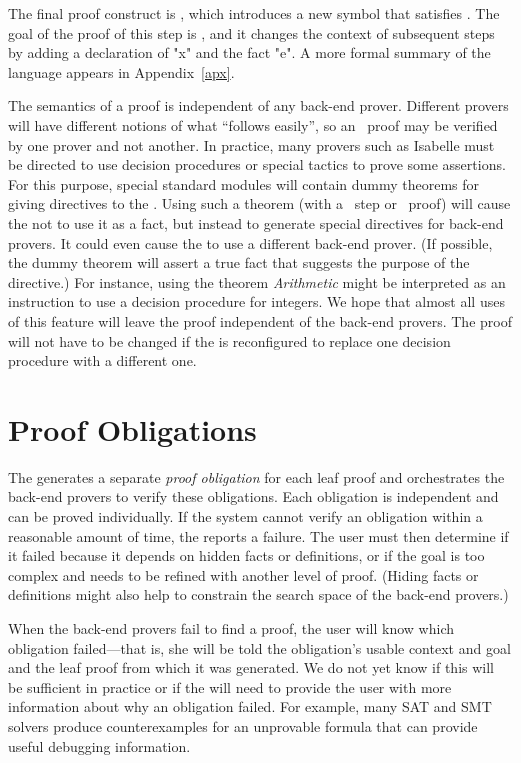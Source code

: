 \documentclass[a4paper]{easychair}
\begin{document}
The final \tlatwo proof construct is , which introduces
a new symbol  that satisfies .  The goal of the proof of this
\PICK step is , and it changes the context of
subsequent steps by adding a declaration of "x" and the fact "e". 
A more formal summary of the language appears in Appendix~\ref{apx}.

The semantics of a \tlatwo proof is independent of any back-end
prover. Different provers will have different notions of what
``follows easily'', so an \OBVIOUS\ proof may be verified by one
prover and not another.  In practice, many provers such as Isabelle
must be directed to use decision procedures or special tactics to
prove some assertions.  For this purpose, special standard modules
will contain dummy theorems for giving directives to the
\PM.  Using such a theorem (with a \USE\ step or \BY\ proof) will
cause the \PM not to use it as a fact, but instead to generate
special directives for back-end provers.  It could even cause the \PM
to use a different back-end prover.  (If possible, the dummy theorem
will assert a true fact that suggests the purpose of the directive.)
\ednote{}{}For instance, using the theorem \emph{Arithmetic}
might be interpreted as an instruction to use a decision procedure for
integers.
We hope that almost all uses of this feature will leave the \tlatwo
proof independent of the back-end provers.  The proof will not have
to be changed if the \PM is reconfigured to replace one decision
procedure with a different one.

\section{Proof Obligations}
\label{sec:obligations}

The \PM generates a separate \textit{proof obligation} for each leaf
proof and orchestrates the back-end provers to verify these
obligations.  Each obligation is independent and can be proved
individually.  If the system cannot verify an obligation within a
reasonable amount of time, the \PM reports a failure.  The user must
then determine if it failed because it depends on hidden facts or
definitions, or if the goal is too complex and needs to be refined
with another level of proof.  (Hiding facts or definitions might also
help to constrain the search space of the back-end provers.)

When the back-end provers fail to find a proof, the user will know
which obligation failed---that is, she will be told the
obligation's usable context and goal and the leaf proof from which it
was generated.  We do not yet know if this will be sufficient in
practice or if the \PM will need to provide the user with more
information about why an obligation failed.  For example, many SAT and
SMT solvers produce counterexamples for an unprovable formula that
can provide useful debugging information.
\end{document}
